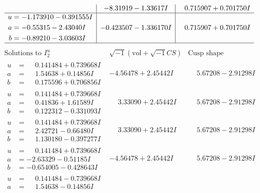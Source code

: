 \documentclass[1p]{elsarticle_modified}
\theoremstyle{definition}
\newcommand{\I}{\sqrt{-1}}
\begin{document}
$$\begin{array}{c|c|c}
 & -8.31919 - 1.33617 I & \phantom{-}0.715907 + 0.701750 I \\ \hline\begin{aligned}
u &= -1.173910 - 0.391555 I \\
a &= -0.55315 - 2.43040 I \\
b &= -0.89210 - 3.03603 I\end{aligned}
 & -0.423507 - 1.336170 I & \phantom{-}0.715907 + 0.701750 I\\
 \hline 
 \end{array}$$\newpage$$\begin{array}{c|c|c}  
\text{Solutions to }I^u_{2}& \I (\text{vol} + \sqrt{-1}CS) & \text{Cusp shape}\\
 \hline 
\begin{aligned}
u &= \phantom{-}0.141484 + 0.739668 I \\
a &= \phantom{-}1.54638 + 0.14856 I \\
b &= \phantom{-}0.175596 + 0.706856 I\end{aligned}
 & -4.56478 + 2.45442 I & \phantom{-}5.67208 - 2.91298 I \\ \hline\begin{aligned}
u &= \phantom{-}0.141484 + 0.739668 I \\
a &= \phantom{-}0.41836 + 1.61589 I \\
b &= \phantom{-}0.122312 - 0.331093 I\end{aligned}
 & \phantom{-}3.33090 + 2.45442 I & \phantom{-}5.67208 - 2.91298 I \\ \hline\begin{aligned}
u &= \phantom{-}0.141484 + 0.739668 I \\
a &= \phantom{-}2.42721 - 0.66480 I \\
b &= \phantom{-}1.130180 - 0.397277 I\end{aligned}
 & \phantom{-}3.33090 + 2.45442 I & \phantom{-}5.67208 - 2.91298 I \\ \hline\begin{aligned}
u &= \phantom{-}0.141484 + 0.739668 I \\
a &= -2.63329 - 0.51185 I \\
b &= -0.654005 - 0.428643 I\end{aligned}
 & -4.56478 + 2.45442 I & \phantom{-}5.67208 - 2.91298 I \\ \hline\begin{aligned}
u &= \phantom{-}0.141484 - 0.739668 I \\
a &= \phantom{-}1.54638 - 0.14856 I \\

\end{aligned}
\end{array}$$
\end{document}
